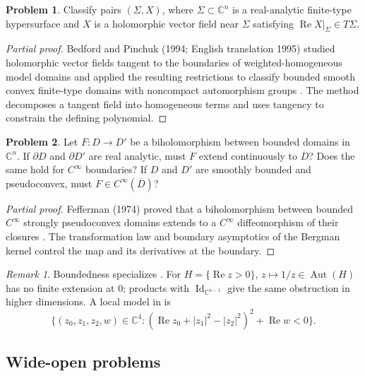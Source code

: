 \documentclass[11pt,reqno]{amsart}
\theoremstyle{definition}
\newtheorem{problem}{Problem}[section]
\theoremstyle{remark}
\newtheorem*{remark}{Remark}
\begin{document}
\begin{problem}\label{FS-3.19}
Classify pairs $(\Sigma,X)$, where $\Sigma\subset\mathbb C^n$ is a real-analytic finite-type hypersurface and $X$ is a holomorphic vector field near $\Sigma$ satisfying $\operatorname{Re}X|_\Sigma\in T\Sigma$.
\end{problem}
\begin{proof}[Partial proof]
Bedford and Pinchuk (1994; English translation 1995) studied holomorphic vector fields tangent to the boundaries of weighted-homogeneous model domains and applied the resulting restrictions to classify bounded smooth convex finite-type domains with noncompact automorphism groups \cite{FS-BedfordPinchuk}. The method decomposes a tangent field into homogeneous terms and uses tangency to constrain the defining polynomial.
\end{proof}

\begin{problem}\label{FS-3.20}\label{b95-9-4-1}
Let $F:D\to D'$ be a biholomorphism between bounded domains in $\mathbb C^n$. If $\partial D$ and $\partial D'$ are real analytic, must $F$ extend continuously to $\overline D$? Does the same hold for $C^\infty$ boundaries? If $D$ and $D'$ are smoothly bounded and pseudoconvex, must $F\in C^\infty(\overline D)$?
\end{problem}
\begin{proof}[Partial proof]
Fefferman (1974) proved that a biholomorphism between bounded $C^\infty$ strongly pseudoconvex domains extends to a $C^\infty$ diffeomorphism of their closures \cite{FS-Fefferman}. The transformation law and boundary asymptotics of the Bergman kernel control the map and its derivatives at the boundary.
\end{proof}
\begin{remark}
Boundedness specializes \cite[Problem~9.4.1]{B95}. For $H=\{\operatorname{Re}z>0\}$, $z\mapsto1/z\in\operatorname{Aut}(H)$ has no finite extension at $0$; products with $\operatorname{Id}_{\mathbb C^{n-1}}$ give the same obstruction in higher dimensions.
A local model in \cite[Question~3.20]{FS2001} is
\[
 \{(z_0,z_1,z_2,w)\in\mathbb C^4:
 (\operatorname{Re}z_0+|z_1|^2-|z_2|^2)^2+\operatorname{Re}w<0\}.
\]
\end{remark}

\subsection{Wide-open problems}
\end{document}
